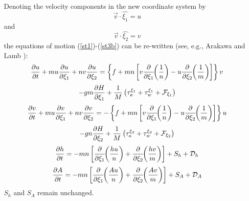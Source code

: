 Denoting the velocity components in the new coordinate system by
\begin{equation}
   \vec{v} \cdot \hat{\xi_1} = u
\end{equation}
and
\begin{equation}
   \vec{v} \cdot \hat{\xi_2} = v
\end{equation}
the equations of motion (\ref{st1})-(\ref{st3b}) can be re-written
(see, e.g., Arakawa and Lamb \cite{AL}):
{\samepage
\[
   {\partial u \over \partial t} +
   m u {\partial u \over \partial \xi_1} +
   n v {\partial u \over \partial \xi_2} =
   \left\{f + mn \left[ v \frac{\partial}{\partial \xi_1}
   \!\! \left( \frac{1}{n} \right) - u \frac{\partial}{\partial \xi_2}
   \!\! \left( \frac{1}{m} \right) \right] \right\} v
\]
\begin{equation}
   - gm {\partial H \over \partial \xi_1} +
   {1 \over M} \left( \tau_a^{\xi_1} + \tau_w^{\xi_1} + {\cal F}_{\xi_1}
   \right)
\label{st13}
\end{equation}
}
\vspace{.2cm}
{\samepage
\[
   {\partial v \over \partial t} +
   m u {\partial v \over \partial \xi_1} +
   n v {\partial v \over \partial \xi_2} =
   - \left\{f + mn \left[ v \frac{\partial}{\partial \xi_1}
   \!\! \left( \frac{1}{n} \right) - u \frac{\partial}{\partial \xi_2}
   \!\! \left( \frac{1}{m} \right) \right] \right\} u
\]
\begin{equation}
   - gn {\partial H \over \partial \xi_2} +
   {1 \over M} \left( \tau_a^{\xi_2} + \tau_w^{\xi_2} + {\cal F}_{\xi_2}
   \right)
\label{st14}
\end{equation}
}
\vspace{.2cm}
\begin{equation}
   {\partial h \over \partial t} =
   - mn \left[ {\partial \over \partial \xi_1} \!\! \left( {hu \over n}
   \right ) + {\partial \over \partial \xi_2} \!\! \left( {hv \over m}
   \right) \right] + S_h + {\cal D}_h
\label{st15}
\end{equation}
\vspace{.2cm}
\begin{equation}
   {\partial A \over \partial t} =
   - mn \left[ {\partial \over \partial \xi_1} \!\! \left( {Au \over n}
   \right ) + {\partial \over \partial \xi_2} \!\! \left( {Av \over m}
   \right) \right] + S_A + {\cal D}_A
\label{st16}
\end{equation}
\vspace{.2cm}
$S_h$ and $S_A$ remain unchanged.

